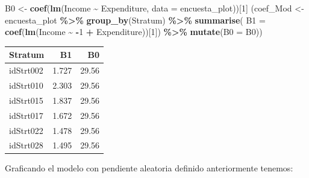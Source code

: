 \documentclass[
  spanish,
  12pt,
]{book}
\newenvironment{Shaded}{\begin{snugshade}}{\end{snugshade}}
\newcommand{\AttributeTok}[1]{\textcolor[rgb]{0.13,0.29,0.53}{#1}}
\newcommand{\DecValTok}[1]{\textcolor[rgb]{0.00,0.00,0.81}{#1}}
\newcommand{\FunctionTok}[1]{\textcolor[rgb]{0.13,0.29,0.53}{\textbf{#1}}}
\newcommand{\NormalTok}[1]{#1}
\newcommand{\OtherTok}[1]{\textcolor[rgb]{0.56,0.35,0.01}{#1}}
\newcommand{\SpecialCharTok}[1]{\textcolor[rgb]{0.81,0.36,0.00}{\textbf{#1}}}
\begin{document}
\begin{Shaded}
\begin{Highlighting}[]
\NormalTok{B0 }\OtherTok{\textless{}{-}} \FunctionTok{coef}\NormalTok{(}\FunctionTok{lm}\NormalTok{(Income }\SpecialCharTok{\textasciitilde{}}\NormalTok{ Expenditure,}
              \AttributeTok{data =}\NormalTok{ encuesta\_plot))[}\DecValTok{1}\NormalTok{]}
\NormalTok{(coef\_Mod }\OtherTok{\textless{}{-}}\NormalTok{ encuesta\_plot }\SpecialCharTok{\%\textgreater{}\%} \FunctionTok{group\_by}\NormalTok{(Stratum) }\SpecialCharTok{\%\textgreater{}\%} 
  \FunctionTok{summarise}\NormalTok{(}
    \AttributeTok{B1 =} \FunctionTok{coef}\NormalTok{(}\FunctionTok{lm}\NormalTok{(Income }\SpecialCharTok{\textasciitilde{}} \SpecialCharTok{{-}}\DecValTok{1} \SpecialCharTok{+}\NormalTok{ Expenditure))[}\DecValTok{1}\NormalTok{]) }\SpecialCharTok{\%\textgreater{}\%} 
  \FunctionTok{mutate}\NormalTok{(}\AttributeTok{B0 =}\NormalTok{ B0))}
\end{Highlighting}
\end{Shaded}

\begin{tabular}{l|r|r}
\hline
Stratum & B1 & B0\\
\hline
idStrt002 & 1.727 & 29.56\\
\hline
idStrt010 & 2.303 & 29.56\\
\hline
idStrt015 & 1.837 & 29.56\\
\hline
idStrt017 & 1.672 & 29.56\\
\hline
idStrt022 & 1.478 & 29.56\\
\hline
idStrt028 & 1.495 & 29.56\\
\hline
\end{tabular}

Graficando el modelo con pendiente aleatoria definido anteriormente tenemos:
\end{document}
